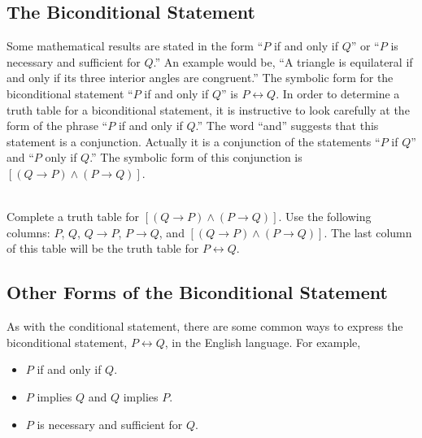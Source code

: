 
\subsection*{The Biconditional Statement}
%
Some mathematical results are stated in the form  ``$P$  if and only if  $Q$'' or ``$P$  is necessary and sufficient for  $Q$.''  An example would be, ``A triangle is equilateral if and only if its three interior angles are congruent.''
The symbolic form for the biconditional statement  ``$P$  if and only if  $Q$''   is  $P \leftrightarrow Q$. 
\label{sym:bicond}%
  In order to determine a truth table for a biconditional statement, it is instructive to look carefully at the form of the phrase  ``$P$  if and only if  $Q$.''  The word ``and'' suggests that this statement is a conjunction.  Actually it is a conjunction of the statements 
``$P$ if $Q$'' and ``$P$ only if $Q$.''  
The symbolic form of this conjunction is  $\left[ {\left( {Q \to P} \right) \wedge \left( {P \to Q} \right)} \right]$.
\begin{prog}\label{pr:biconditional} \hfill \\
Complete a truth table for $\left[ {\left( {Q \to P} \right) \wedge \left( {P \to Q} \right)} \right]$.  Use the following columns:  $P$, $Q$, $Q \to P$, $P \to Q$, and $\left[ {\left( {Q \to P} \right) \wedge \left( {P \to Q} \right)} \right]$.  The last column of this table will be the truth table for $P \leftrightarrow Q$.
\end{prog}
\vskip6pt

\subsection*{Other Forms of the Biconditional Statement}
%
As with the conditional statement, there are some common ways to express the biconditional statement,  $P \leftrightarrow Q$, in the English language. For example,
\begin{multicols}{2}
\begin{itemize}
  \item $P$  if and only if  $Q$.
  \item $P$ implies  $Q$  and  $Q$  implies  $P$.
  \item $P$ is necessary and sufficient for  $Q$.
\end{itemize}
\end{multicols}
\hbreak


\endinput
